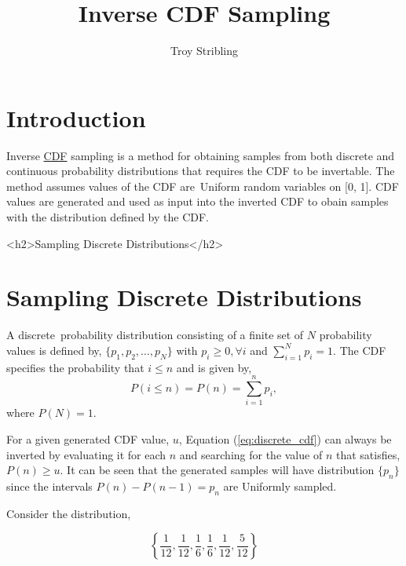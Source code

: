 \documentclass[12pt]{article}
\title{Inverse CDF Sampling}
\author{Troy Stribling}
\begin{document}
\iftex
\maketitle
\section{Introduction}
\fi

Inverse \href{https://en.wikipedia.org/wiki/Cumulative_distribution_function}{CDF} sampling is a method for obtaining samples
from both discrete and continuous probability distributions
that requires the CDF to be invertable. The method assumes values of the CDF are Uniform random variables on [0, 1].
CDF values are generated and used as input into the inverted CDF to obain samples with the distribution defined by the CDF.

\ifblog
<h2>Sampling Discrete Distributions</h2>
\fi
\iftex
\section{Sampling Discrete Distributions}
\fi

A discrete probability distribution consisting of a finite set of $N$ probability values is defined by,
$\{p_1, p_2,\ldots,p_N\}$ with $p_i \geq 0, \forall i$ and $\sum_{i=1}^N{p_i} = 1.$ The CDF specifies the probability
that $i \leq n$ and is given by,
\begin{equation}
\label{eq:discrete_cdf}
P(i \leq n)=P(n)=\sum_{i=1}^n{p_i},
\end{equation}
where $P(N)=1.$

For a given generated CDF value, $u$, Equation (\ref{eq:discrete_cdf}) can always be inverted by evaluating it for each $n$ and
searching for the value of $n$ that satisfies, $P(n) \geq u.$ It can be seen that the generated samples will have
distribution $\{p_n\}$ since the intervals $P(n)-P(n-1) = p_n$ are Uniformly sampled.

Consider the distribution,

\begin{equation} 
\left\{\frac{1}{12}, \frac{1}{12}, \frac{1}{6}, \frac{1}{6}, \frac{1}{12}, \frac{5}{12} \right\}
\label{eq:discrete}
\end{equation}
\end{document}
